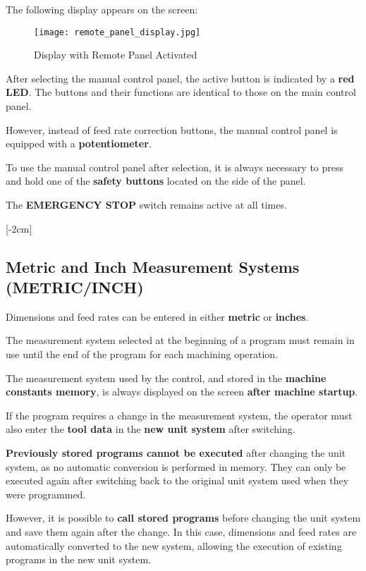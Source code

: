 The following display appears on the screen:

\begin{figure}[h]
    \centering
    \texttt{[image: remote\_panel\_display.jpg]}
    \caption{Display with Remote Panel Activated}
\end{figure}

\newpage
\notes

After selecting the manual control panel, the active button is indicated by a \textbf{red LED}. The buttons and their functions are identical to those on the main control panel.

However, instead of feed rate correction buttons, the manual control panel is equipped with a \textbf{potentiometer}.

To use the manual control panel after selection, it is always necessary to press and hold one of the \textbf{safety buttons} located on the side of the panel.

The \textbf{EMERGENCY STOP} switch remains active at all times.

[-2cm]

\subsection{Metric and Inch Measurement Systems (METRIC/INCH)}

Dimensions and feed rates can be entered in either \textbf{metric} or \textbf{inches}.

The measurement system selected at the beginning of a program must remain in use until the end of the program for each machining operation.

The measurement system used by the control, and stored in the \textbf{machine constants memory}, is always displayed on the screen \textbf{after machine startup}.

If the program requires a change in the measurement system, the operator must also enter the \textbf{tool data} in the \textbf{new unit system} after switching.

\textbf{Previously stored programs cannot be executed} after changing the unit system, as no automatic conversion is performed in memory. They can only be executed again after switching back to the original unit system used when they were programmed.

However, it is possible to \textbf{call stored programs} before changing the unit system and save them again after the change. In this case, dimensions and feed rates are automatically converted to the new system, allowing the execution of existing programs in the new unit system.

